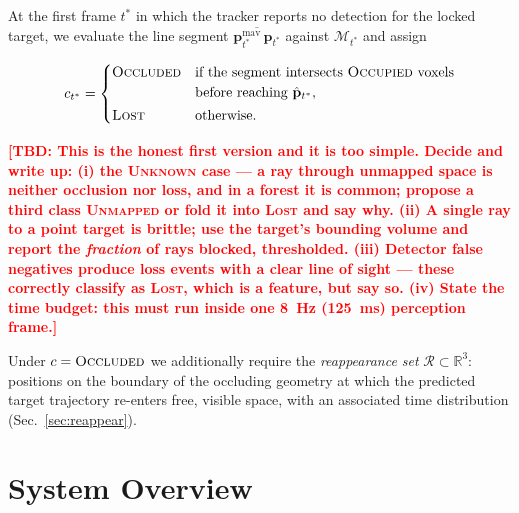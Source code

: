 \documentclass[conference]{IEEEtran}
\newcommand{\tbd}[1]{\textcolor{red}{\textbf{[TBD: #1]}}}
\newcommand{\occluded}{\textsc{Occluded}}
\newcommand{\lost}{\textsc{Lost}}
\begin{document}
At the first frame $t^\ast$ in which the tracker reports no detection for the
locked target, we evaluate the line segment
$\overline{\mathbf{p}^{\text{mav}}_{t^\ast}\,\hat{\mathbf{p}}_{t^\ast}}$ against
$\mathcal{M}_{t^\ast}$ and assign

\begin{equation}
c_{t^\ast} =
\begin{cases}
\occluded{} & \text{if the segment intersects \textsc{Occupied} voxels} \\
             & \text{before reaching } \hat{\mathbf{p}}_{t^\ast},\\[2pt]
\lost{}      & \text{otherwise.}
\end{cases}
\label{eq:classify}
\end{equation}

\tbd{This is the honest first version and it is too simple. Decide and write up:
(i) the \textsc{Unknown} case --- a ray through unmapped space is neither
occlusion nor loss, and in a forest it is common; propose a third class
\textsc{Unmapped} or fold it into \lost{} and say why. (ii) A single ray to a
point target is brittle; use the target's bounding volume and report the
\emph{fraction} of rays blocked, thresholded. (iii) Detector false negatives
produce loss events with a clear line of sight --- these correctly classify as
\lost{}, which is a feature, but say so. (iv) State the time budget: this must
run inside one \SI{8}{\hertz} (\SI{125}{\milli\second}) perception frame.}

Under $c=\occluded{}$ we additionally require the \emph{reappearance set}
$\mathcal{R} \subset \mathbb{R}^3$: positions on the boundary of the occluding
geometry at which the predicted target trajectory re-enters free, visible space,
with an associated time distribution (Sec.~\ref{sec:reappear}).

\section{System Overview}
\label{sec:system}
\end{document}
